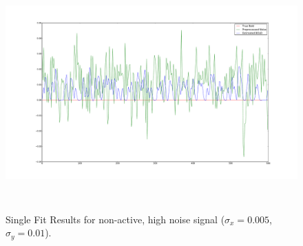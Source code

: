 \begin{figure}[H]
\centering
\includegraphics[clip=true,trim=6cm 3cm 6cm 3cm,height=9cm]{images/justbignoise_fit_0}
\caption[Single Fit Results for non-active, high noise signal.]
{Single Fit Results for non-active, high noise signal
 ($\sigma_x = 0.005$, $\sigma_y = 0.01$).}
\label{fig:justbignoise_fit_0}
\end{figure} %


